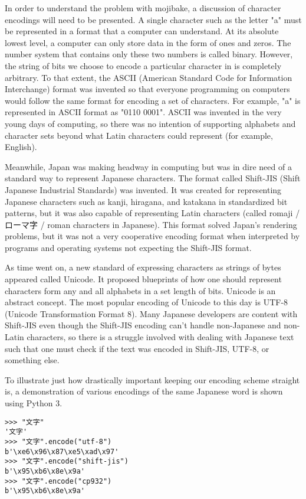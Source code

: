 \documentclass{acm} %
\begin{document}
\begin{CJK}{UTF8}{zhsong}
In order to understand the problem with mojibake, a discussion of character encodings will need to be presented. A single character such as the letter "a" must be represented in a format that a computer can understand. At its absolute lowest level, a computer can only store data in the form of ones and zeros. The number system that contains only these two numbers is called binary. However, the string of bits we choose to encode a particular character in is completely arbitrary. To that extent, the ASCII (American Standard Code for Information Interchange) format was invented so that everyone programming on computers would follow the same format for encoding a set of characters. For example, "a" is represented in ASCII format as "0110 0001". ASCII was invented in the very young days of computing, so there was no intention of supporting alphabets and character sets beyond what Latin characters could represent (for example, English).

Meanwhile, Japan was making headway in computing but was in dire need of a standard way to represent Japanese characters. The format called Shift-JIS (Shift Japanese Industrial Standards) was invented. It was created for representing Japanese characters such as kanji, hiragana, and katakana in standardized bit patterns, but it was also capable of representing Latin characters (called romaji / ローマ字 / roman characters in Japanese). This format solved Japan's rendering problems, but it was not a very cooperative encoding format when interpreted by programs and operating systems not expecting the Shift-JIS format.

As time went on, a new standard of expressing characters as strings of bytes appeared called Unicode. It proposed blueprints of how one should represent characters form any and all alphabets in a set length of bits. Unicode is an abstract concept. The most popular encoding of Unicode to this day is UTF-8 (Unicode Transformation Format 8). Many Japanese developers are content with Shift-JIS even though the Shift-JIS encoding can't handle non-Japanese and non-Latin characters, so there is a struggle involved with dealing with Japanese text such that one must check if the text was encoded in Shift-JIS, UTF-8, or something else.

To illustrate just how drastically important keeping our encoding scheme straight is, a demonstration of various encodings of the same Japanese word is shown using Python 3.

\begin{verbatim}
>>> "文字"
'文字'
>>> "文字".encode("utf-8")
b'\xe6\x96\x87\xe5\xad\x97'
>>> "文字".encode("shift-jis")
b'\x95\xb6\x8e\x9a'
>>> "文字".encode("cp932")
b'\x95\xb6\x8e\x9a'
\end{verbatim}


\end{CJK}
\end{document}
